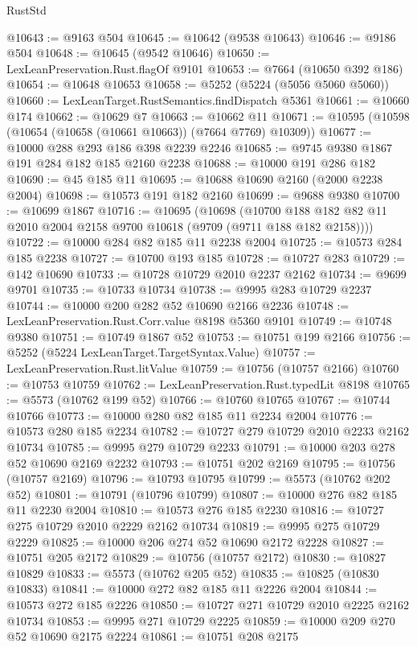 \begin{lexlean}{RustStd}
\begin{coremodule}
@10643 := @9163 @504
@10645 := @10642 (@9538 @10643)
@10646 := @9186 @504
@10648 := @10645 (@9542 @10646)
@10650 := LexLeanPreservation.Rust.flagOf @9101
@10653 := @7664 (@10650 @392 @186)
@10654 := @10648 @10653
@10658 := @5252 (@5224 (@5056 @5060 @5060))
@10660 := LexLeanTarget.RustSemantics.findDispatch @5361
@10661 := @10660 @174
@10662 := @10629 @7
@10663 := @10662 @11
@10671 := @10595 (@10598 (@10654 (@10658 (@10661 @10663)) (@7664 @7769) @10309))
@10677 := @10000 @288 @293 @186 @398 @2239 @2246
@10685 := @9745 @9380 @1867 @191 @284 @182 @185 @2160 @2238
@10688 := @10000 @191 @286 @182
@10690 := @45 @185 @11
@10695 := @10688 @10690 @2160 (@2000 @2238 @2004)
@10698 := @10573 @191 @182 @2160
@10699 := @9688 @9380
@10700 := @10699 @1867
@10716 := @10695
    (@10698
      (@10700 @188 @182 @82 @11 @2010 @2004 @2158 @9700 @10618 (@9709 (@9711 @188 @182 @2158))))
@10722 := @10000 @284 @82 @185 @11 @2238 @2004
@10725 := @10573 @284 @185 @2238
@10727 := @10700 @193 @185
@10728 := @10727 @283
@10729 := @142 @10690
@10733 := @10728 @10729 @2010 @2237 @2162
@10734 := @9699 @9701
@10735 := @10733 @10734
@10738 := @9995 @283 @10729 @2237
@10744 := @10000 @200 @282 @52 @10690 @2166 @2236
@10748 := LexLeanPreservation.Rust.Corr.value @8198 @5360 @9101
@10749 := @10748 @9380
@10751 := @10749 @1867 @52
@10753 := @10751 @199 @2166
@10756 := @5252 (@5224 LexLeanTarget.TargetSyntax.Value)
@10757 := LexLeanPreservation.Rust.litValue
@10759 := @10756 (@10757 @2166)
@10760 := @10753 @10759
@10762 := LexLeanPreservation.Rust.typedLit @8198
@10765 := @5573 (@10762 @199 @52)
@10766 := @10760 @10765
@10767 := @10744 @10766
@10773 := @10000 @280 @82 @185 @11 @2234 @2004
@10776 := @10573 @280 @185 @2234
@10782 := @10727 @279 @10729 @2010 @2233 @2162 @10734
@10785 := @9995 @279 @10729 @2233
@10791 := @10000 @203 @278 @52 @10690 @2169 @2232
@10793 := @10751 @202 @2169
@10795 := @10756 (@10757 @2169)
@10796 := @10793 @10795
@10799 := @5573 (@10762 @202 @52)
@10801 := @10791 (@10796 @10799)
@10807 := @10000 @276 @82 @185 @11 @2230 @2004
@10810 := @10573 @276 @185 @2230
@10816 := @10727 @275 @10729 @2010 @2229 @2162 @10734
@10819 := @9995 @275 @10729 @2229
@10825 := @10000 @206 @274 @52 @10690 @2172 @2228
@10827 := @10751 @205 @2172
@10829 := @10756 (@10757 @2172)
@10830 := @10827 @10829
@10833 := @5573 (@10762 @205 @52)
@10835 := @10825 (@10830 @10833)
@10841 := @10000 @272 @82 @185 @11 @2226 @2004
@10844 := @10573 @272 @185 @2226
@10850 := @10727 @271 @10729 @2010 @2225 @2162 @10734
@10853 := @9995 @271 @10729 @2225
@10859 := @10000 @209 @270 @52 @10690 @2175 @2224
@10861 := @10751 @208 @2175

\end{coremodule}
\end{lexlean}
